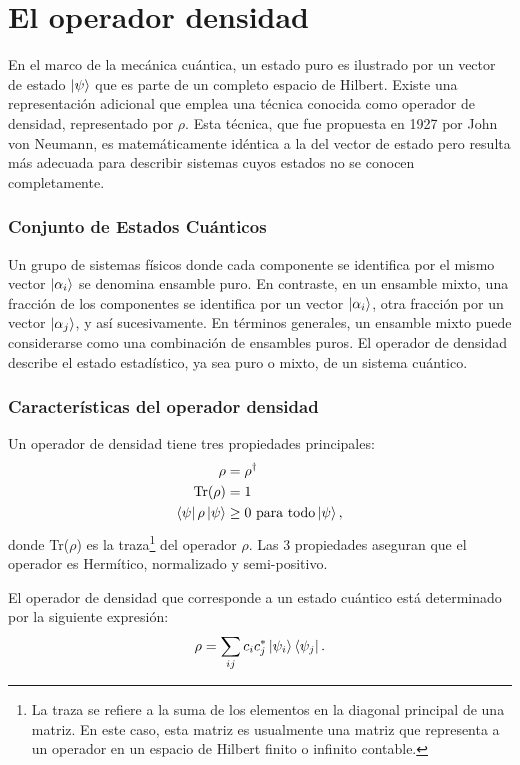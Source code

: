 \documentclass[main.tex]{subfiles}
\begin{document}
\section{El operador densidad}
En el marco de la mecánica cuántica, un estado puro es ilustrado por un vector de estado $\ket{\psi}$ que es parte de un completo espacio de Hilbert. Existe una representación adicional que emplea una técnica conocida como operador de densidad, representado por $\rho$. Esta técnica, que fue propuesta en 1927 por John von Neumann, es matemáticamente idéntica a la del vector de estado pero resulta más adecuada para describir sistemas cuyos estados no se conocen completamente.

\subsubsection{Conjunto de Estados Cuánticos}
Un grupo de sistemas físicos donde cada componente se identifica por el mismo vector $\ket{\alpha_i}$ se denomina ensamble puro. En contraste, en un ensamble mixto, una fracción de los componentes se identifica por un vector $\ket{\alpha_i}$, otra fracción por un vector $\ket{\alpha_j}$, y así sucesivamente. En términos generales, un ensamble mixto puede considerarse como una combinación de ensambles puros. El operador de densidad describe el estado estadístico, ya sea puro o mixto, de un sistema cuántico.

\subsubsection{Características del operador densidad}
Un operador de densidad tiene tres propiedades principales:
\begin{subequations}
	\begin{align}
		\rho &= \rho^{\dagger}\\
		\text{Tr}(\rho) &=1\\
		\bra{\psi} \rho \ket{\psi} &\geq 0 \, \, \text{para todo} \ket{\psi},
	\end{align}
\end{subequations}
donde Tr($\rho$) es la traza\footnote{La traza se refiere a la suma de los elementos en la diagonal principal de una matriz. En este caso, esta matriz es usualmente una matriz que representa a un operador en un espacio de Hilbert finito o infinito contable.} del operador $\rho$. Las 3 propiedades aseguran que el operador es Hermítico, normalizado y semi-positivo.

El operador de densidad que corresponde a un estado cuántico está determinado por la siguiente expresión:
\begin{align}\label{eq:statePure}
	\rho = \sum_{ij} c_i c_j^* \ket{\psi_i} \bra{\psi_j}.
\end{align}
\end{document}
